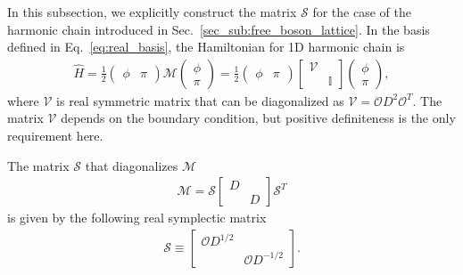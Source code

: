 In this subsection, we explicitly construct the matrix $\mathcal{S}$ for the case of the harmonic chain introduced in Sec.~\ref{sec_sub:free_boson_lattice}. In the basis defined in Eq.~\eqref{eq:real_basis}, the Hamiltonian for 1D harmonic chain is
\begin{equation}\begin{aligned}
\hat{H}
=\frac{1}{2}
\begin{pmatrix}
\phi & \pi
\end{pmatrix}
\mathcal{M}
\begin{pmatrix}
\phi\\
\pi
\end{pmatrix}
=\frac{1}{2}
\begin{pmatrix}
\phi & \pi
\end{pmatrix}
\begin{bmatrix}
\mathcal{V} \\
& {\mathbb{ I}}
\end{bmatrix}
\begin{pmatrix}
\phi\\
\pi
\end{pmatrix},
\end{aligned}\end{equation}
where $\mathcal{V}$ is real symmetric matrix that can be diagonalized as $\mathcal{V}=\mathcal{O}D^2\mathcal{O}^T$. The matrix $\mathcal{V}$ depends on the boundary condition, but positive definiteness is the only requirement here. 

The matrix $\mathcal{S}$ that diagonalizes $\mathcal{M}$
\begin{equation}
\begin{aligned}
\mathcal{M}=\mathcal{S}
\begin{bmatrix}
D \\ 
& D
\end{bmatrix}
\mathcal{S}^T
\end{aligned}
\end{equation}
is given by the following real symplectic matrix
\begin{equation}\begin{aligned}
\mathcal{S}\equiv
\begin{bmatrix}
\mathcal{O}D^{1/2} \\
& \mathcal{O}D^{-1/2}
\end{bmatrix}.
\end{aligned}\end{equation}


